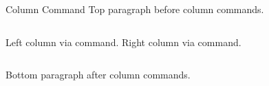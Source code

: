 \documentclass[14pt,t]{beamer-accessibility}
\begin{document}
\begin{frame}{Column Command}
Top paragraph before column commands.

\begin{columns}[T]
Left column via command.
Right column via command.
\end{columns}

Bottom paragraph after column commands.
\end{frame}
\end{document}
